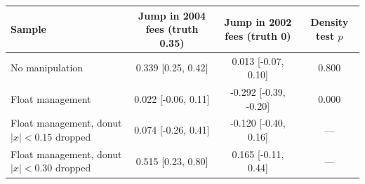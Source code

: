 \begin{tabular}{lccc}\toprule
Sample & Jump in 2004 fees (truth 0.35) & Jump in 2002 fees (truth 0) & Density test $p$ \\ \midrule
No manipulation & 0.339 [0.25, 0.42] & 0.013 [-0.07, 0.10] & 0.800 \\
Float management & 0.022 [-0.06, 0.11] & -0.292 [-0.39, -0.20] & 0.000 \\
Float management, donut $|x| < 0.15$ dropped & 0.074 [-0.26, 0.41] & -0.120 [-0.40, 0.16] & --- \\
Float management, donut $|x| < 0.30$ dropped & 0.515 [0.23, 0.80] & 0.165 [-0.11, 0.44] & --- \\
\bottomrule\end{tabular}
